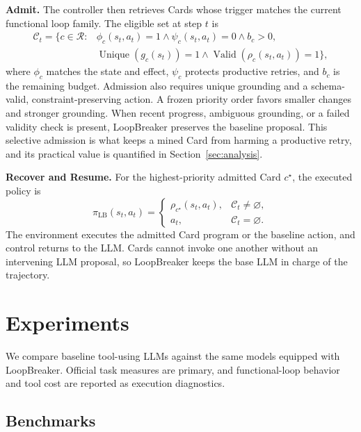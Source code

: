 \documentclass[letterpaper]{article}
\begin{document}
\textbf{Admit.}\quad
The controller then retrieves Cards whose trigger matches the current functional loop family. The eligible set at step $t$ is
\begin{equation}
\begin{aligned}
\mathcal{C}_t=\{c\in\mathcal{R}:{}&\phi_c(s_t,a_t)=1\land\psi_c(s_t,a_t)=0\land b_c>0,\\
&\operatorname{Unique}(g_c(s_t))=1\land\operatorname{Valid}(\rho_c(s_t,a_t))=1\},
\end{aligned}
\label{eq:eligible}
\end{equation}
where $\phi_c$ matches the state and effect, $\psi_c$ protects productive retries, and $b_c$ is the remaining budget. Admission also requires unique grounding and a schema-valid, constraint-preserving action. A frozen priority order favors smaller changes and stronger grounding. When recent progress, ambiguous grounding, or a failed validity check is present, LoopBreaker preserves the baseline proposal. This selective admission is what keeps a mined Card from harming a productive retry, and its practical value is quantified in Section~\ref{sec:analysis}.

\textbf{Recover and Resume.}\quad
For the highest-priority admitted Card $c^\star$, the executed policy is
\begin{equation}
\pi_{\mathrm{LB}}(s_t,a_t)=
\begin{cases}
\rho_{c^\star}(s_t,a_t), & \mathcal{C}_t\neq\varnothing,\\
a_t, & \mathcal{C}_t=\varnothing.
\end{cases}
\label{eq:controller}
\end{equation}
The environment executes the admitted Card program or the baseline action, and control returns to the LLM. Cards cannot invoke one another without an intervening LLM proposal, so LoopBreaker keeps the base LLM in charge of the trajectory.


\section{Experiments}
\label{sec:experiments}

We compare baseline tool-using LLMs against the same models equipped with LoopBreaker. Official task measures are primary, and functional-loop behavior and tool cost are reported as execution diagnostics.

\subsection*{Benchmarks}
\end{document}

